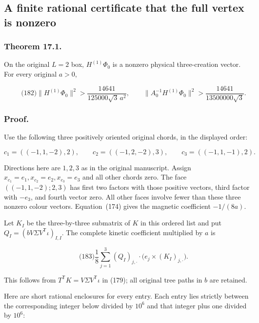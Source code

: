 \subsection{A finite rational certificate that the full vertex is
nonzero}\label{nonabelian-vertex-md-a-finite-rational-certificate-that-the-full-vertex-is-nonzero}

\subsubsection{Theorem 17.1.}\label{nonabelian-vertex-md-theorem-17.1.}

On the original \(L=2\) box, \(H^{(1)}\Phi_0\) is a nonzero physical
three-creation vector. For every original \(a>0\),

\[
\qquad\text{(182)}
 \|H^{(1)}\Phi_0\|^2>
              \frac{14641}{125000\sqrt3\,a^2},\qquad
 \|A_0^{-1}H^{(1)}\Phi_0\|^2>
              \frac{14641}{13500000\sqrt3}.
\]

\subsubsection{Proof.}\label{nonabelian-vertex-md-proof.}

Use the following three positively oriented original chords, in the
displayed order:

\[
c_1=((-1,1,-2),2),\qquad c_2=((-1,2,-2),3),\qquad
 c_3=((-1,1,-1),2).
\]

Directions here are \(1,2,3\) as in the original manuscript. Assign
\(x_{c_1}=e_1,x_{c_2}=e_2,x_{c_3}=e_3\) and all other chords zero. The
face \(((-1,1,-2);2,3)\) has first two factors with those positive
vectors, third factor with \(-e_3\), and fourth vector zero. All other
faces involve fewer than these three nonzero colour vectors.
Equation~(174) gives the magnetic coefficient \(-1/(8a)\).

Let \(K_I\) be the three-by-three submatrix of \(K\) in this ordered
list and put \(Q_I=(bV\Sigma V^{\mathsf T}\iota)_{I,I}\). The complete
kinetic coefficient multiplied by \(a\) is

\[
\qquad\text{(183)}
 \frac18\sum_{j=1}^3(Q_I)_{j,\cdot}
                   \cdot\bigl(e_j\times(K_I)_{j,\cdot}\bigr).
\]

This follows from \(T^{\mathsf T}K=V\Sigma V^{\mathsf T}\iota\) in
(179); all original tree paths in \(b\) are retained.

Here are short rational enclosures for every entry. Each entry lies
strictly between the corresponding integer below divided by \(10^6\) and
that integer plus one divided by \(10^6\):

